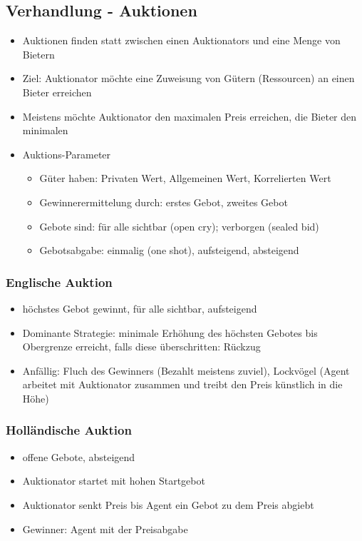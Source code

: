 \documentclass{article} %
\begin{document}
	\subsection{Verhandlung - Auktionen}
	\begin{itemize}
		\item Auktionen finden statt zwischen einen Auktionators und eine Menge von Bietern 
		\item Ziel: Auktionator möchte eine Zuweisung von Gütern (Ressourcen) an einen Bieter erreichen
		\item Meistens möchte Auktionator den maximalen Preis erreichen, die Bieter den minimalen
		\item Auktions-Parameter
		\begin{itemize}
			\item Güter haben: Privaten Wert, Allgemeinen Wert, Korrelierten Wert
			\item Gewinnerermittelung durch: erstes Gebot, zweites Gebot
			\item Gebote sind: für alle sichtbar (open cry); verborgen (sealed bid)
			\item Gebotsabgabe: einmalig (one shot), aufsteigend, absteigend
		\end{itemize}
	\end{itemize}
	\subsubsection{Englische Auktion}
	\begin{itemize}
		\item höchstes Gebot gewinnt, für alle sichtbar, aufsteigend
		\item Dominante Strategie: minimale Erhöhung des höchsten Gebotes bis Obergrenze erreicht, falls diese überschritten: Rückzug
		\item Anfällig: Fluch des Gewinners (Bezahlt meistens zuviel), Lockvögel (Agent arbeitet mit Auktionator zusammen und treibt den Preis künstlich in die Höhe)
	\end{itemize}
	\subsubsection{Holländische Auktion}
	\begin{itemize}
		\item offene Gebote, absteigend
		\item Auktionator startet mit hohen Startgebot
		\item Auktionator senkt Preis bis Agent ein Gebot zu dem Preis abgiebt
		\item Gewinner: Agent mit der Preisabgabe
	\end{itemize}
\end{document}
